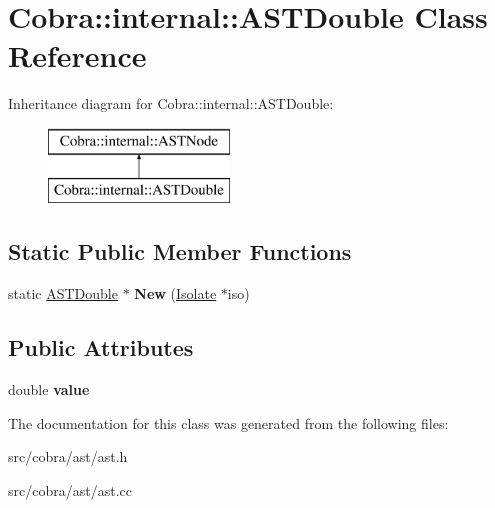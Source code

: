 \hypertarget{class_cobra_1_1internal_1_1_a_s_t_double}{\section{Cobra\+:\+:internal\+:\+:A\+S\+T\+Double Class Reference}
\label{class_cobra_1_1internal_1_1_a_s_t_double}
}
Inheritance diagram for Cobra\+:\+:internal\+:\+:A\+S\+T\+Double\+:\begin{figure}[H]
\begin{center}
\leavevmode
\includegraphics[height=2.000000cm]{class_cobra_1_1internal_1_1_a_s_t_double}
\end{center}
\end{figure}
\subsection*{Static Public Member Functions}
\begin{DoxyCompactItemize}
\item 
\hypertarget{class_cobra_1_1internal_1_1_a_s_t_double_a6c84e6897b4f7a67e074a88c355034c1}{static \hyperlink{class_cobra_1_1internal_1_1_a_s_t_double}{A\+S\+T\+Double} $\ast$ {\bfseries New} (\hyperlink{class_cobra_1_1internal_1_1_isolate}{Isolate} $\ast$iso)}\label{class_cobra_1_1internal_1_1_a_s_t_double_a6c84e6897b4f7a67e074a88c355034c1}

\end{DoxyCompactItemize}
\subsection*{Public Attributes}
\begin{DoxyCompactItemize}
\item 
\hypertarget{class_cobra_1_1internal_1_1_a_s_t_double_adb8d73d965bffb93e8caab014e3f1241}{double {\bfseries value}}\label{class_cobra_1_1internal_1_1_a_s_t_double_adb8d73d965bffb93e8caab014e3f1241}

\end{DoxyCompactItemize}


The documentation for this class was generated from the following files\+:\begin{DoxyCompactItemize}
\item 
src/cobra/ast/ast.\+h\item 
src/cobra/ast/ast.\+cc\end{DoxyCompactItemize}
